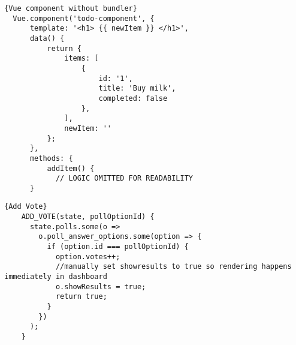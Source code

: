 \begin{lstlisting}[caption=Vue component without bundler, captionpos=b, style=htmlcssjs, label=compwobundler]{Vue component without bundler}
  Vue.component('todo-component', {
      template: '<h1> {{ newItem }} </h1>',
      data() {
          return {
              items: [
                  {
                      id: '1',
                      title: 'Buy milk',
                      completed: false
                  },
              ],
              newItem: ''
          };
      },
      methods: {
          addItem() {
            // LOGIC OMITTED FOR READABILITY
      }
  \end{lstlisting}

  \begin{lstlisting}[caption=Add Vote, captionpos=b, style=htmlcssjs, label=addvote]{Add Vote}
    ADD_VOTE(state, pollOptionId) {
      state.polls.some(o =>
        o.poll_answer_options.some(option => {
          if (option.id === pollOptionId) {
            option.votes++;
            //manually set showresults to true so rendering happens immediately in dashboard
            o.showResults = true;
            return true;
          }
        })
      );
    }
  \end{lstlisting}

